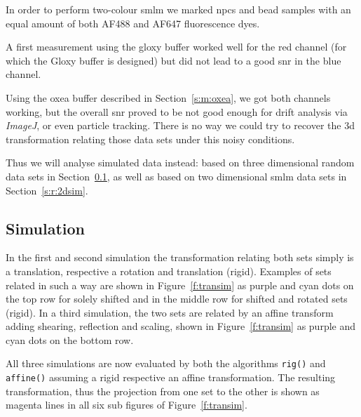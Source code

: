 \documentclass[11pt, a4paper, oneside, twocolumn]{report}
\renewcommand{\tt}{\texttt}
\newcommand{\e}{\emph}
\newcommand{\x}[1]{#1\index{#1}}
\begin{document}
In order to perform two-colour \gls{smlm} we marked \gls{npc}s and
bead samples with an equal amount of both AF488 and AF647 fluorescence
dyes.

A first measurement using the \gls{gloxy} buffer worked well for the
red channel (for which the Gloxy buffer is designed) but did not lead
to a good \gls{snr} in the blue channel.

Using the \gls{oxea} buffer described in Section~\ref{s:m:oxea}, we
got both channels working, but the overall \gls{snr} proved to be not
good enough for drift analysis via \e{ImageJ}, or even \x{particle
tracking}. There is no way we could try to recover the 3d
transformation relating those data sets under this noisy conditions.

Thus we will analyse simulated data instead: based on three
dimensional random data sets in Section~\ref{s:r:3dsim}, as well as
based on two dimensional \gls{smlm} data sets in
Section~\ref{s:r:2dsim}.


\subsection{Simulation}\label{s:r:3dsim}

In the first and second simulation the transformation relating both
sets simply is a translation, respective a rotation and translation
(rigid). Examples of sets related in such a way are shown in
Figure~\ref{f:transim} as purple and cyan dots on the top row for
solely shifted and in the middle row for shifted and rotated sets
(rigid). In a third simulation, the two sets are related by an affine
transform adding shearing, reflection and scaling, shown in
Figure~\ref{f:transim} as purple and cyan dots on the bottom row.

All three simulations are now evaluated by both the algorithms
\tt{rig()} and \tt{affine()} assuming a rigid respective an affine
transformation. The resulting transformation, thus the projection from
one set to the other is shown as magenta lines in all six sub figures
of Figure~\ref{f:transim}.
\end{document}
